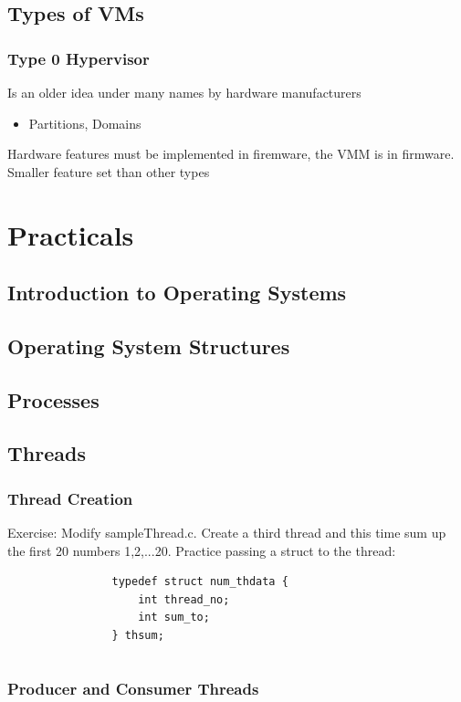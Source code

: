 \documentclass[oneside]{book}
\begin{document}
        \section{Types of VMs}
            \subsection{Type 0 Hypervisor}
                Is an older idea under many names by hardware manufacturers
                    \begin{itemize}
                        \item Partitions, Domains
                    \end{itemize}
                Hardware features must be implemented in firemware, the VMM is in firmware. Smaller feature set than other types
    \listoffigures
    \chapter{Practicals}
        \section{Introduction to Operating Systems}
        \section{Operating System Structures}
        \section{Processes}
        \section{Threads}
            \subsection{Thread Creation}
            Exercise: Modify sampleThread.c. Create a third thread and this time sum up the first 20 numbers {1,2,...20}.
            Practice passing a struct to the thread:
            \begin{verbatim}
                typedef struct num_thdata {
                    int thread_no;
                    int sum_to;
                } thsum;
            \end{verbatim}
                \inputminted{c}{code/threads/prac/sampleThread.c}
            \subsection{Producer and Consumer Threads}
\end{document}
